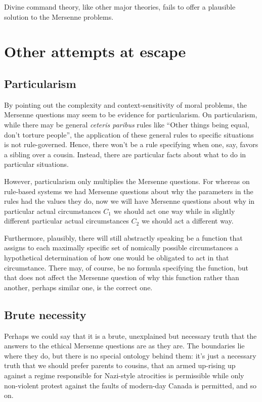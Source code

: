 Divine command theory, like other major theories, fails to offer a plausible solution to the Mersenne problems.

\section{Other attempts at escape}
\subsection{Particularism}
By pointing out the complexity and context-sensitivity of moral problems, the Mersenne questions may seem to be
evidence for particularism. On particularism, while there may be general \textit{ceteris paribus} rules
like ``Other things being equal, don't torture people'', the application of these general rules to specific situations is not
rule-governed. Hence, there won't be a rule specifying when one, say, favors a sibling over a cousin. Instead, there are 
particular facts about what to do in particular situations. 

However, particularism only multiplies the Mersenne questions. For whereas on rule-based systems we had Mersenne questions
about why the parameters in the rules had the values they do, now we will have Mersenne questions about why in particular actual
circumstances $C_1$ we should act one way while in slightly different particular actual circumstances $C_2$ we should act a
different way.

Furthermore, plausibly, there will still abstractly speaking be a function that assigns to each maximally
specific set of nomically possible circumstances a hypothetical determination
of how one would be obligated to act in that circumstance.
There may, of course, be no formula specifying the function, but that does not
affect the Mersenne question of why this function rather than another, perhaps similar one, is the correct one.

\subsection{Brute necessity}
Perhaps we could say that it is a brute, unexplained but necessary truth that the answers to the ethical Mersenne questions are as they are.
The boundaries lie where they do, but there is no special ontology behind them: it's just a necessary truth that we should prefer parents to cousins,
that an armed up-rising up against a regime responsible for Nazi-style atrocities is permissible while only non-violent protest against the
faults of modern-day Canada is permitted, and so on. 

